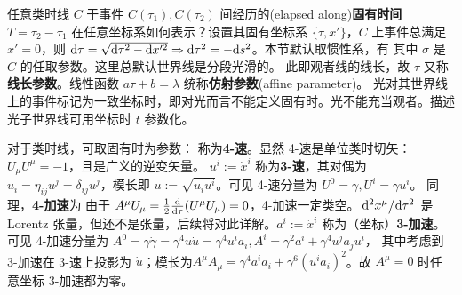 任意类时线 $C$ 于事件 $C(\tau_1),C(\tau_2)$ 间经历的(elapsed along)\textbf{固有时间} $T=\tau_2-\tau_1$ 在任意坐标系如何表示？设置其固有坐标系 $\{\tau,x'\}$，$C$ 上事件总满足 $x'=0$，则 $\dd\tau=\sqrt{\dd\tau^2-\dd x'^2}\Rightarrow \dd\tau^2=-\dd s^2$。本节默认取惯性系，有
其中 $\sigma$ 是 $C$ 的任取参数。这里总默认世界线是分段光滑的。
此即观者线的线长，故 $\tau$ 又称\textbf{线长参数}。线性函数 $a\tau+b=\lambda$ 统称\textbf{仿射参数}(affine parameter)。
光对其世界线上的事件标记为一致坐标时，即对光而言不能定义固有时。光不能充当观者。描述光子世界线可用坐标时 $t$ 参数化。

对于类时线，可取固有时为参数：
称为\textbf{4-速}。显然 4-速是单位类时切矢：$U_\mu U^\mu=-1$，且是广义的逆变矢量。
$u^i:=\dot{x}^i$ 称为\textbf{3-速}，其对偶为 $u_i=\eta_{ij}u^j=\delta_{ij}u^j$，模长即 $u:=\sqrt{u_i u^i}$。可见 4-速分量为 $U^0=\gamma,U^i=\gamma u^i$。
同理，\textbf{4-加速}为
由于 $A^\mu U_\mu=\frac 12 \dv{\tau}(U^\mu U_\mu)=0$，4-加速一定类空。$\dv*[2]{x^\mu}{\tau}$ 是 Lorentz 张量，但还不是张量，后续将对此详解。$a^i:=\ddot{x}^i$ 称为（坐标）\textbf{3-加速}。
可见 4-加速分量为 $A^0=\gamma \dot{\gamma}=\gamma^4 u\dot{u}=\gamma^4 u^ia_i, A^i=\gamma^2 a^i+\gamma^4 u^ja_j u^i$，
其中考虑到 3-加速在 3-速上投影为 $\dot{u}$；模长为$A^\mu A_\mu=\gamma^4 a^ia_i+\gamma^6(u^ia_i)^2$。故 $A^\mu=0$ 时任意坐标 3-加速都为零。

